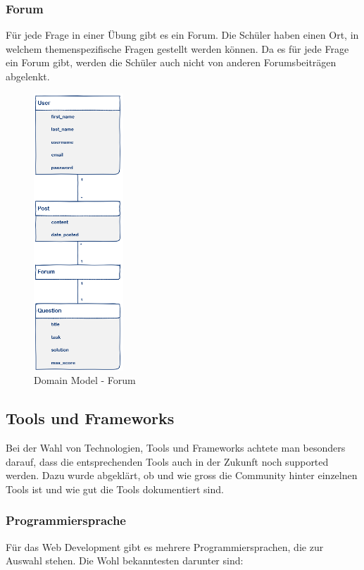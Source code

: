 \subsubsection*{Forum}
Für jede Frage in einer Übung gibt es ein Forum. Die Schüler haben einen Ort, in welchem themenspezifische Fragen gestellt werden können. Da es für jede Frage ein Forum gibt, werden die Schüler auch nicht von anderen Forumsbeiträgen abgelenkt.
\begin{figure}[H]
\begin{center}
	\includegraphics[width=0.3\textwidth, keepaspectratio]{images/domain_model_forum.png}
	\caption{Domain Model - Forum}
	\label{fig:domain_model_forum}
\end{center}
\end{figure}

\newpage

\subsection{Tools und Frameworks}
Bei der Wahl von Technologien, Tools und Frameworks achtete man besonders darauf, dass die entsprechenden Tools auch in der Zukunft noch supported werden. Dazu wurde abgeklärt, ob und wie gross die Community hinter einzelnen Tools ist und wie gut die Tools dokumentiert sind.

\subsubsection*{Programmiersprache}
Für das Web Development gibt es mehrere Programmiersprachen, die zur Auswahl stehen. Die Wohl bekanntesten darunter sind:

